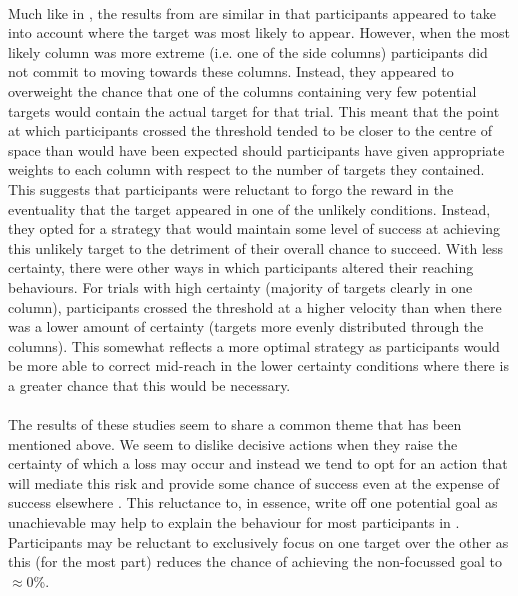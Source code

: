 \documentclass[12pt]{article}
\begin{document}
\paragraph{} Much like in \cite{CHAPMAN2010168}, the results from \cite{Hudson2007probmove} are similar in that participants appeared to take into account where the target was most likely to appear. However, when the most likely column was more extreme (i.e. one of the side columns) participants did not commit to moving towards these columns. Instead, they appeared to overweight the chance that one of the columns containing very few potential targets would contain the actual target for that trial. This meant that the point at which participants crossed the threshold tended to be closer to the centre of space than would have been expected should participants have given appropriate weights to each column with respect to the number of targets they contained. This suggests that participants were reluctant to forgo the reward in the eventuality that the target appeared in one of the unlikely conditions. Instead, they opted for a strategy that would maintain some level of success at achieving this unlikely target to the detriment of their overall chance to succeed. With less certainty, there were other ways in which participants altered their reaching behaviours. For trials with high certainty (majority of targets clearly in one column), participants crossed the threshold at a higher velocity than when there was a lower amount of certainty (targets more evenly distributed through the columns). This somewhat reflects a more optimal strategy as participants would be more able to correct mid-reach in the lower certainty conditions where there is a greater chance that this would be necessary. 


\paragraph{} The results of these studies seem to share a common theme that has been mentioned above. We seem to dislike decisive actions when they raise the certainty of which a loss may occur \citep{KahnemanProspect} and instead we tend to opt for an action that will mediate this risk and provide some chance of success even at the expense of success elsewhere \citep{Koehler2010,Hudson2007probmove}. This reluctance to, in essence, write off one potential goal as unachievable may help to explain the behaviour for most participants in \cite{clarke2015failure}. Participants may be reluctant to exclusively focus on one target over the other as this (for the most part) reduces the chance of achieving the non-focussed goal to $\approx$0\%.
\end{document}
